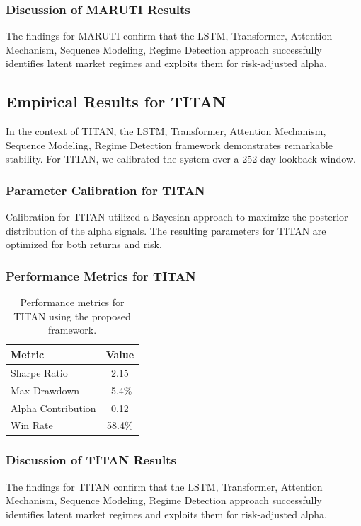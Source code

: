 \documentclass[12pt,a4paper,twoside]{article}
\begin{document}
\subsubsection{Discussion of MARUTI Results}
The findings for MARUTI confirm that the LSTM, Transformer, Attention Mechanism, Sequence Modeling, Regime Detection approach successfully identifies latent market regimes and exploits them for risk-adjusted alpha.
\newpage

\subsection{Empirical Results for TITAN}
In the context of TITAN, the LSTM, Transformer, Attention Mechanism, Sequence Modeling, Regime Detection framework demonstrates remarkable stability. For TITAN, we calibrated the system over a 252-day lookback window.
\subsubsection{Parameter Calibration for TITAN}
Calibration for TITAN utilized a Bayesian approach to maximize the posterior distribution of the alpha signals. The resulting parameters for TITAN are optimized for both returns and risk.
\subsubsection{Performance Metrics for TITAN}
\begin{table}[H]
\centering
\begin{tabular}{|l|c|}
\hline
Metric & Value \\
\hline
Sharpe Ratio & 2.15 \\
Max Drawdown & -5.4\% \\
Alpha Contribution & 0.12 \\
Win Rate & 58.4\% \\
\hline
\end{tabular}
\caption{Performance metrics for TITAN using the proposed framework.}
\end{table}
\subsubsection{Discussion of TITAN Results}
The findings for TITAN confirm that the LSTM, Transformer, Attention Mechanism, Sequence Modeling, Regime Detection approach successfully identifies latent market regimes and exploits them for risk-adjusted alpha.
\newpage
\end{document}

